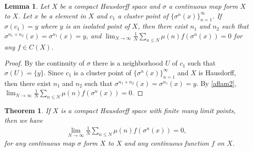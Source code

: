 \documentclass[a4paper,10pt]{amsart}
\newtheorem{theorem}{Theorem}[section]
\newtheorem{lemma}{Lemma}[section]
\begin{document}
\begin{lemma} \label{aflam3}
   Let $X$ be a compact Hausdorff space and $\sigma$ a continuous 
   map form $X$ to $X$. 
   Let $x$ be a element in $X$ and $c_{1}$ a cluster point of 
   $\{\sigma^{n}(x)\}_{n=1}^{\infty}$. 
   If $\sigma(c_1) = y$ 
   where $y$ is an isolated point of $X$, then there exist 
   $n_1$ and $n_2$ such that $\sigma^{n_1 + n_2}(x) = \sigma^{n_1}(x) =y$, 
   and $\lim_{N \rightarrow \infty}
   \frac{1}{N} \sum_{n \leq N}\mu(n)f(\sigma^{n}(x)) = 0$ for any 
   $f \in C(X)$.
\end{lemma}

\begin{proof}
   By the continuity of $\sigma$ there is a neighborhood $U$ of $c_1$ 
   such that $\sigma(U) = \{y\}$. 
   Since $c_1$ is a cluster point of $\{\sigma^{n}(x)\}_{n=1}^{\infty}$
   and $X$ is Hausdorff, then there exist $n_1$ and $n_2$ 
   such that $\sigma^{n_1 + n_2}(x) = \sigma^{n_1}(x) =y$. By \cref{aflam2},
   $\lim_{N \rightarrow \infty}
   \frac{1}{N} \sum_{n \leq N}\mu(n)f(\sigma^{n}(x)) = 0$.
\end{proof}

\begin{theorem}\label{afthm1}
   If $X$ is a compact Hausdorff space with finite many limit 
   points, then we have 
   \begin{align*}
      \lim_{N \rightarrow \infty}
       \frac{1}{N} \sum_{n \leq N}\mu(n)f(\sigma^{n}(x)) = 0,
   \end{align*}
   for any continuous map $\sigma$ form $X$ to $X$ and any continuous
   function $f$ on $X$.
\end{theorem}
\end{document}
